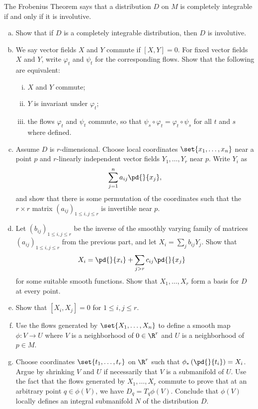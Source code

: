\documentclass[10pt]{mypackage}
\begin{document}
\begin{problem}[Problem 3]
  The Frobenius Theorem says that a distribution $D$ on $M$ is completely integrable if and only if it is involutive.
  \begin{enumerate}[(a)]
    \item Show that if $D$ is a completely integrable distribution, then $D$ is involutive.
    \item We say vector fields $X$ and $Y$ commute if $ \left[ X,Y \right] = 0 $. For fixed vector fields $X$ and $Y$, write $\varphi_t$ and $\psi_t$ for the corresponding flows. Show that the following are equivalent:
      \begin{enumerate}[(i)]
        \item $X$ and $Y$ commute;
        \item $Y$ is invariant under $\varphi_t$;
        \item the flows $\varphi_t$ and $\psi_t$ commute, so that $\psi_s\circ \varphi_t = \varphi_t\circ \psi_s$ for all $t$ and $s$ where defined.
      \end{enumerate}
    \item Assume $D$ is $r$-dimensional. Choose local coordinates $\set{x_1,\dots,x_n}$ near a point $p$ and $r$-linearly independent vector fields $Y_1,\dots,Y_r$ near $p$. Write $Y_i$ as
      \begin{align*}
        \sum_{j=1}^{n} a_{ij} \pd{}{x_j},
      \end{align*}
      and show that there is some permutation of the coordinates such that the $r\times r$ matrix $\left( a_{ij} \right)_{1\leq i,j\leq r}$ is invertible near $p$.
    \item Let $\left( b_{ij} \right)_{1\leq i,j\leq r}$ be the inverse of the smoothly varying family of matrices $\left( a_{ij} \right)_{1\leq i,j\leq r}$ from the previous part, and let $X_i = \sum_{j}b_{ij}Y_j$. Show that
      \begin{align*}
        X_i &= \pd{}{x_i} + \sum_{j > r} c_{ij} \pd{}{x_j}
      \end{align*}
      for some suitable smooth functions. Show that $X_1,\dots,X_r$ form a basis for $D$ at every point.
    \item Show that $\left[ X_i,X_j \right] = 0$ for $1\leq i,j\leq r$.
    \item Use the flows generated by $\set{X_1,\dots,X_n}$ to define a smooth map $\phi\colon V\rightarrow U$ where $V$ is a neighborhood of $0\in\R^{r}$ and $U$ is a neighborhood of $p\in M$.
    \item Choose coordinates $\set{t_1,\dots,t_r}$ on $\R^{r}$ such that $\phi_{\ast}\left( \pd{}{t_i} \right) = X_i$. Argue by shrinking $V$ and $U$ if necessarily that $V$ is a submanifold of $U$. Use the fact that the flows generated by $X_1,\dots,X_r$ commute to prove that at an arbitrary point $q\in \phi(V)$, we have $D_q = T_q\phi(V)$. Conclude that $\phi(V)$ locally defines an integral submanifold $N$ of the distribution $D$.
  \end{enumerate}
\end{problem}
\end{document}

